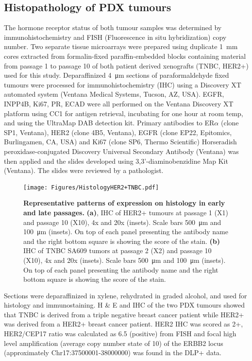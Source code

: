 \subsection{Histopathology of PDX tumours} 
The hormone receptor status of both tumour samples was determined by immunohistochemistry and FISH (Fluorescence in situ hybridization) copy number.
Two separate tissue microarrays were prepared using duplicate \SI{1}{\mm} cores extracted from formalin-fixed paraffin-embedded blocks containing material from passage 1 to passage 10 of both patient derived xenografts (TNBC, HER2+) used for this study. 
Deparaffinized \SI{4}{\um} sections of paraformaldehyde fixed tumours were processed for immunohistochemistry (IHC) using a Discovery XT automated system (Ventana Medical Systems, Tucson, AZ, USA). 
EGFR, INPP4B, Ki67, PR, ECAD were all performed on the Ventana Discovery XT platform using CC1 for antigen retrieval, incubating for one hour at room temp, and using the UltraMap DAB detection kit.
Primary antibodies to ER$\alpha$ (clone SP1, Ventana), HER2 (clone 4B5, Ventana), EGFR (clone EP22, Epitomics, Burlingamen, CA, USA) and Ki67 (clone SP6, Thermo Scientific) 
Horseradish peroxidase-conjugated Discovery Universal Secondary Antibody (Ventana) was then applied and the slides developed using 3,3’-diaminobenzidine Map Kit (Ventana). 
The slides were reviewed by a pathologist.



 \begin{figure}
\centering
\texttt{[image: Figures/HistologyHER2+TNBC.pdf]}
	
\caption[Untreated PDX timeseries and growth trajectories]
	{\small
\textbf{Representative patterns of expression on histology in early and late passages.}
 \textbf{(a)}, IHC of HER2+ tumours at passage 1 (X1) and passage 10 (X10), 4x and 20x (insets). Scale bars \SI{500}{\micro\metre} and \SI{100}{\micro\metre} (insets). On top of each panel presenting the antibody name and the right bottom square is showing the score of the stain.
\textbf{(b)} IHC of TNBC SA609 tumors at passage 2 (X2) and passage 10 (X10), 4x and 20x (insets). Scale bars \SI{500}{\micro\metre} and \SI{100}{\micro\metre} (insets). On top of each panel presenting the antibody name and the right bottom square is showing the score of the stain.}
	\label{fig:HistologyHER2+TNBC}
\end{figure}




Sections were deparaffinized in xylene, rehydrated in graded alcohol, and used for histology and immunostaining. 
H \& E and \ac{IHC}  of the two PDX tumours showed that TNBC is  derived from a triple negative breast cancer patient while HER2+ was derived from a HER2+ breast cancer patient. HER2 IHC was scored as 2+, HER2/CEP17 ratio was calculated as 6.5 (positive)\cite{ahn2020her2} from  \ac{FISH}  and focal high level amplification (average copy number state of 10) of the \ac{ERBB2} locus (approximately Chr17:37500001-38000000) was found in the DLP+ data.

